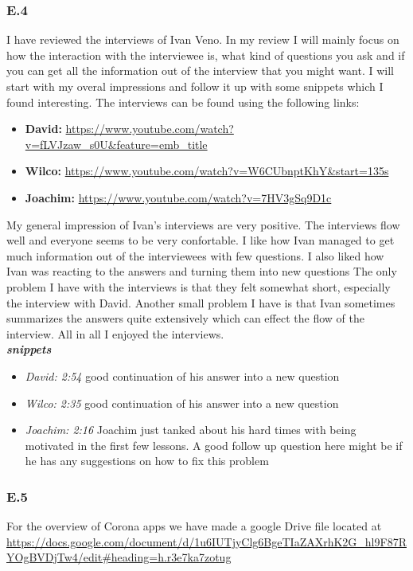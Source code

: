\documentclass[]{article}
\begin{document}
\subsubsection*{E.4}
I have reviewed the interviews of Ivan Veno. In my review I will mainly focus 
on how the interaction with the interviewee is, what kind of questions you ask 
and if you can get all the information out of the interview that you might want. 
I will start with my overal impressions and follow it up with some snippets which 
I found interesting. The interviews can be found using the following links:
\begin{itemize}
    \item[] \textbf{David: } \url{https://www.youtube.com/watch?v=fLVJzaw_s0U&feature=emb_title}
    \item[] \textbf{Wilco: } \url{https://www.youtube.com/watch?v=W6CUbnptKhY&start=135s}
    \item[] \textbf{Joachim: } \url{https://www.youtube.com/watch?v=7HV3gSq9D1c}
\end{itemize}
My general impression of Ivan's interviews are very positive. The interviews
flow well and everyone seems to be very confortable. I like how Ivan managed 
to get much information out of the interviewees with few questions. 
I also liked how Ivan was reacting to the answers and turning them into new questions
The only problem I have with the interviews is that they felt somewhat short, especially the interview with David. 
Another small problem I have is that Ivan sometimes summarizes the answers quite extensively which can effect the flow of the interview.
All in all I enjoyed the interviews.\\
\textbf{\textit{snippets}}
\begin{itemize}
    \item [] \textit{David: 2:54} good continuation of his answer into a new question
    \item [] \textit{Wilco: 2:35} good continuation of his answer into a new question
    \item [] \textit{Joachim: 2:16} Joachim just tanked about his hard times with being motivated 
                in the first few lessons. A good follow up question here might be if he has any suggestions
                on how to fix this problem
\end{itemize} 

\subsubsection*{E.5}
For the overview of Corona apps we have made a google Drive file located at
\url{https://docs.google.com/document/d/1u6IUTjyClg6BgeTIaZAXrhK2G_hl9F87RYOgBVDjTw4/edit#heading=h.r3e7ka7zotug}
\end{document}
